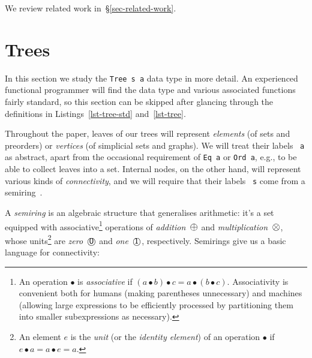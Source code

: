 \documentclass[english,submission]{programming}
\newcommand{\hcode}[1]{{\color{darkblue} \lstinline[keywordstyle={}]|#1|}} %
\newcommand{\add}{\text{\raisebox{-0.1mm}{\large $\oplus$}}}
\newcommand{\mul}{\text{\raisebox{-0.1mm}{\large $\otimes$}}}
\newcommand{\zero}{\raisebox{-0.2mm}{\textcircled{\textsf{0}}}\xspace}
\newcommand{\one}{\raisebox{-0.2mm}{\textcircled{\textsf{\hspace{-0.2mm}1}}}\xspace}
\begin{document}
\noindent
We review related work in~\S\ref{sec-related-work}.

\section{Trees}\label{sec-tree}

In this section we study the \hcode{Tree s a} data type in more detail. An
experienced functional programmer will find the data type and various
associated functions fairly standard, so this section can be skipped after
glancing through the definitions in Listings~\ref{lst-tree-std}
and~\ref{lst-tree}.

Throughout the paper, leaves of our trees will represent \emph{elements} (of
sets and preorders) or \emph{vertices} (of simplicial sets and graphs). We will
treat their labels~\hcode{a} as abstract, apart from the occasional requirement
of \hcode{Eq a} or \hcode{Ord a}, e.g., to be able to collect leaves into a set.
Internal nodes, on the other hand, will represent various kinds of
\emph{connectivity}, and we will require that their labels~\hcode{s} come from
a semiring~\cite{1999_semirings_golan}.

A \emph{semiring} is an algebraic structure that generalises arithmetic: it's a
set equipped with associative\footnote{
    An operation $\bullet$ is \emph{associative} if
    $(a \bullet b) \bullet c = a \bullet (b \bullet c)$. Associativity is
    convenient both for humans (making parentheses unnecessary) and machines
    (allowing large expressions to be efficiently processed by partitioning them
    into smaller subexpressions as necessary).
}
operations of \emph{addition}~$\add$ and \emph{multiplication}~$\mul$, whose
units\footnote{
    An element $e$ is the \emph{unit} (or the \emph{identity element}) of an
    operation $\bullet$ if $e \bullet a = a \bullet e = a$.
}
are \emph{zero}~$\text{\zero}$ and \emph{one}~$\text{\one}$, respectively.
Semirings give us a basic language for connectivity:
\end{document}
